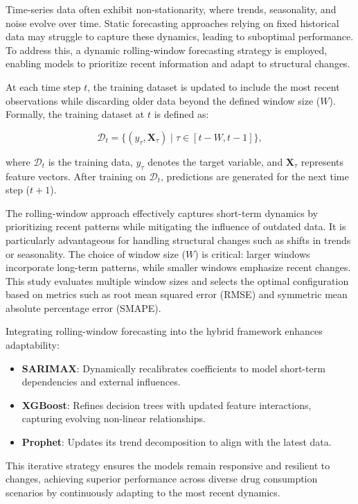 \documentclass[journal]{IEEEtran}
\begin{document}
Time-series data often exhibit non-stationarity, where trends, seasonality, and noise evolve over time. Static forecasting approaches relying on fixed historical data may struggle to capture these dynamics, leading to suboptimal performance. To address this, a dynamic rolling-window forecasting strategy is employed, enabling models to prioritize recent information and adapt to structural changes.

At each time step \(t\), the training dataset is updated to include the most recent observations while discarding older data beyond the defined window size (\(W\)). Formally, the training dataset at \(t\) is defined as:

\[
\mathcal{D}_{t} = \{(y_{\tau}, \mathbf{X}_{\tau}) \mid \tau \in [t - W, t-1]\},
\]

where \(\mathcal{D}_{t}\) is the training data, \(y_{\tau}\) denotes the target variable, and \(\mathbf{X}_{\tau}\) represents feature vectors. After training on \(\mathcal{D}_{t}\), predictions are generated for the next time step (\(t+1\)).

The rolling-window approach effectively captures short-term dynamics by prioritizing recent patterns while mitigating the influence of outdated data. It is particularly advantageous for handling structural changes such as shifts in trends or seasonality. The choice of window size (\(W\)) is critical: larger windows incorporate long-term patterns, while smaller windows emphasize recent changes. This study evaluates multiple window sizes and selects the optimal configuration based on metrics such as root mean squared error (RMSE) and symmetric mean absolute percentage error (SMAPE).

Integrating rolling-window forecasting into the hybrid framework enhances adaptability:
\begin{itemize}
    \item \textbf{SARIMAX}: Dynamically recalibrates coefficients to model short-term dependencies and external influences.
    \item \textbf{XGBoost}: Refines decision trees with updated feature interactions, capturing evolving non-linear relationships.
    \item \textbf{Prophet}: Updates its trend decomposition to align with the latest data.
\end{itemize}

This iterative strategy ensures the models remain responsive and resilient to changes, achieving superior performance across diverse drug consumption scenarios by continuously adapting to the most recent dynamics.
\end{document}
